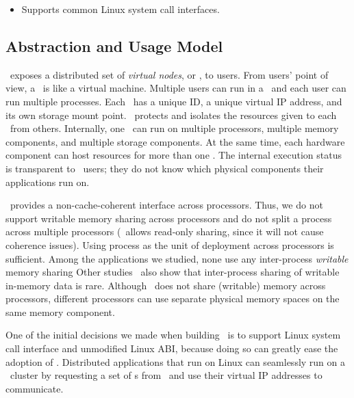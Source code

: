 \documentclass[10pt,times,twocolumn]{z2-article}
\begin{document}
{{{{{{{\begin{itemize}
\item Supports common Linux system call interfaces.

\end{itemize}


\subsection{Abstraction and Usage Model}
\lego\ exposes a distributed set of {\em virtual nodes}, or {\em \vnode}, to users.
From users' point of view, a \vnode\ is like a virtual machine. 
Multiple users can run in a \vnode\ and each user can run multiple processes.
Each \vnode\ has a unique ID, a unique virtual IP address, %
and its own storage mount point. %
\lego\ protects and isolates the resources given to each \vnode\ from others.
Internally, one \vnode\ can run on multiple processors, multiple memory components,
and multiple storage components.
At the same time, each hardware component can host resources for more than one \vnode.
The internal execution status is transparent to \lego\ users;
they do not know which physical components their applications run on.

\lego\ provides a non-cache-coherent interface across processors.
Thus, we do not support writable memory sharing across processors
and do not split a process across multiple processors
(\lego\ allows read-only sharing, since it will not cause coherence issues).
Using process as the unit of deployment across processors is sufficient. %
Among the applications we studied, none use any inter-process {\em writable} memory sharing
Other studies~\cite{OVC} also show that inter-process sharing of writable in-memory data is rare.
Although \lego\ does not share (writable) memory across processors, 
different processors can use separate physical memory spaces on the same memory component.

One of the initial decisions we made when building \lego\ is to support Linux system call interface 
and unmodified Linux ABI,
because doing so can greatly ease the adoption of \lego.
Distributed applications that run on Linux can seamlessly run on a \lego\ cluster
by requesting a set of \vnode{}s from \lego\ and use their virtual IP addresses to communicate.

}}}}}}}
\end{document}
